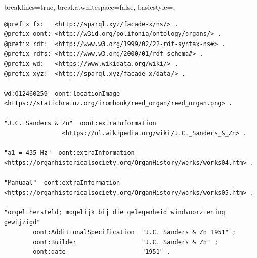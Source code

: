 \lstset
{
    breaklines=true,
    breakatwhitespace=false,
    basicstyle=\linespread{1}\ttfamily,
}
\begin{lstlisting}[caption={Part14\_000Groede}]
@prefix fx:   <http://sparql.xyz/facade-x/ns/> .
@prefix oont: <http://w3id.org/polifonia/ontology/organs/> .
@prefix rdf:  <http://www.w3.org/1999/02/22-rdf-syntax-ns#> .
@prefix rdfs: <http://www.w3.org/2000/01/rdf-schema#> .
@prefix wd:   <https://www.wikidata.org/wiki/> .
@prefix xyz:  <http://sparql.xyz/facade-x/data/> .

wd:Q12460259  oont:locationImage  <https://staticbrainz.org/irombook/reed_organ/reed_organ.png> .

"J.C. Sanders & Zn"  oont:extraInformation
                <https://nl.wikipedia.org/wiki/J.C._Sanders_&_Zn> .

"a1 = 435 Hz"  oont:extraInformation  <https://organhistoricalsociety.org/OrganHistory/works/works04.htm> .

"Manuaal"  oont:extraInformation  <https://organhistoricalsociety.org/OrganHistory/works/works05.htm> .

"orgel hersteld; mogelijk bij die gelegenheid windvoorziening gewijzigd"
        oont:AdditionalSpecification  "J.C. Sanders & Zn 1951" ;
        oont:Builder                  "J.C. Sanders & Zn" ;
        oont:date                     "1951" .


\end{lstlisting}
